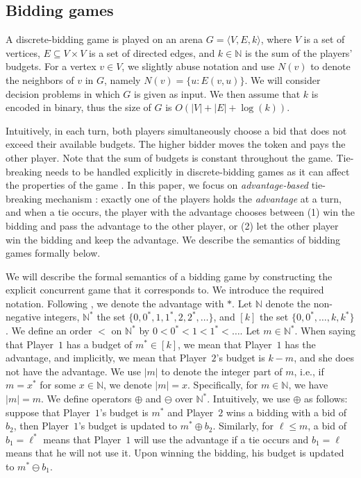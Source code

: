 \documentclass{article}\providecommand{\nequiv}{\not\equiv}\usepackage[a4paper,margin=20mm]{geometry}
\newcommand{\PO}{Player~$1$\xspace}
\newcommand{\PT}{Player~$2$\xspace}
\newcommand{\Nat}{\mathbb{N}}
\newcommand{\zug}[1]{\langle #1  \rangle}
\renewcommand{\set}[1]{\{ #1  \}}
\begin{document}
\subsection{Bidding games}
A discrete-bidding game is played on an arena $G = \zug{V, E, k}$, where $V$ is a set of vertices, $E \subseteq V \times V$ is a set of directed edges, and $k \in \Nat$ is the sum of the players' budgets. For a vertex $v \in V$, we slightly abuse notation and use $N(v)$ to denote the neighbors of $v$ in $G$, namely $N(v) = \set{u: E(v,u)}$. We will consider decision problems in which $G$ is given as input. We then assume that $k$ is encoded in binary, thus the size of $G$ is $O(|V| + |E| + \log(k))$.

Intuitively, in each turn, both players simultaneously choose a bid that does not exceed their available budgets. The higher bidder moves the token and pays the other player. Note that the sum of budgets is constant throughout the game. 
Tie-breaking needs to be handled explicitly in discrete-bidding games as it can affect the properties of the game \cite{AAH21}. In this paper, we focus on {\em advantage-based} tie-breaking mechanism \cite{DP10}: exactly one of the players holds the {\em advantage} at a turn, and when a tie occurs, the player with the advantage chooses between (1) win the bidding and pass the advantage to the other player, or (2) let the other player win the bidding and keep the advantage.
We describe the semantics of bidding games formally below.

We will describe the formal semantics of a bidding game by constructing the explicit concurrent game that it corresponds to. We introduce the required notation. Following \cite{DP10}, we denote the advantage with $*$. Let $\Nat$ denote the non-negative integers, $\Nat^*$ the set $\set{0, 0^*, 1, 1^*, 2, 2^*, \ldots}$, and $[k]$ the set $\set{0,0^*,\ldots, k, k^*}$. We define an order $<$ on $\Nat^*$ by $0 < 0^* < 1 < 1^* < \ldots$. Let $m \in \Nat^*$. When saying that \PO has a budget of $m^* \in [k]$, we mean that \PO has the advantage, and implicitly, we mean that \PT's budget is $k-m$, and she does not have the advantage. 
We use $|m|$ to denote the integer part of $m$, i.e., if \(m = x^*\) for some \(x \in \Nat\), we denote \(|m| = x\).
Specifically, for \(m \in \Nat\), we have \(|m| = m\).  
We define operators $\oplus$ and $\ominus$ over $\Nat^*$.
Intuitively, we use \(\oplus\) as follows: suppose that \PO's budget is $m^*$ and \PT wins a bidding with a bid of $b_2$, then \PO's budget is updated to $m^* \oplus b_2$. Similarly, for $\ell \leq m$, a bid of $b_1 = \ell^*$ means that \PO will use the advantage if a tie occurs and $b_1 = \ell$ means that he will not use it. Upon winning the bidding, his budget is updated to $m^* \ominus b_1$. 
\end{document}
